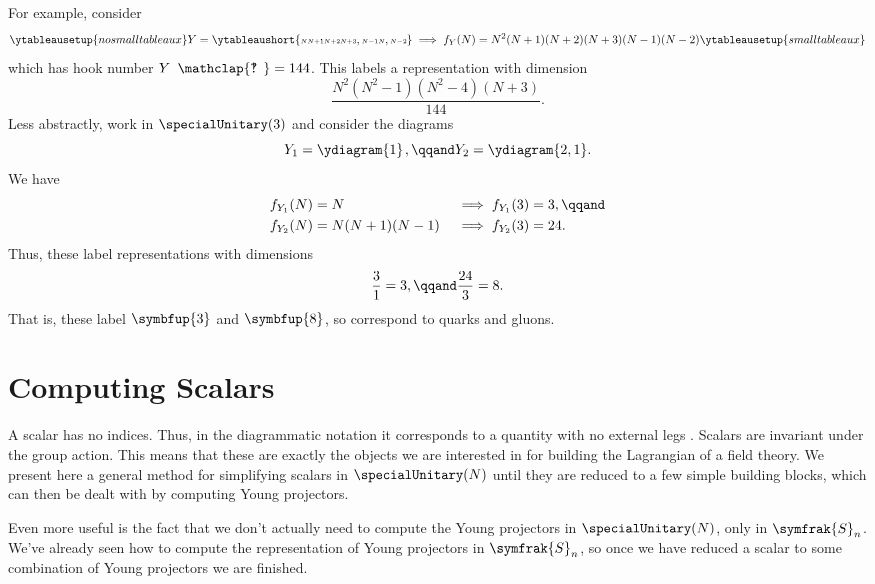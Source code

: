 \documentclass[fleqn]{NotesClass}
\newcommand{\symmetricGroup}[1][n]{\symfrak{S}_{#1}}
\newcommand{\hooknumber}[1]{#1{\phantom{?}\mkern1mu\mathclap{\ooalign{\hfil ? \hfil \cr \hfil ! \hfil}}}}
\newcommand{\rep}[1]{\symbfup{#1}}
\begin{document}
    For example, consider
    \begin{equation}
        \ytableausetup{nosmalltableaux}
        Y = \ytableaushort{{\scriptscriptstyle N}{\scriptscriptstyle N+1}{\scriptscriptstyle N+2}{\scriptscriptstyle N+3},{\scriptscriptstyle N-1}{\scriptscriptstyle N},{\scriptscriptstyle N-2}} \implies f_Y(N) = N^2(N + 1)(N + 2)(N + 3)(N - 1)(N - 2)
        \ytableausetup{smalltableaux}
    \end{equation}
    which has hook number \(\hooknumber{Y} = 144\).
    This labels a representation with dimension
    \begin{equation}
        \frac{N^2(N^2 - 1)(N^2 - 4)(N + 3)}{144}.
    \end{equation}
    Less abstractly, work in \(\specialUnitary(3)\) and consider the diagrams
    \begin{equation}
        Y_1 = \ydiagram{1}\mkern2mu, \qqand Y_2 = \ydiagram{2,1}.
    \end{equation}
    We have
    \begin{align}
        f_{Y_1}(N) &= N &&\implies f_{Y_1}(3) = 3, \qqand\\
        f_{Y_2}(N) &= N(N + 1)(N - 1) &&\implies f_{Y_2}(3) = 24.
    \end{align}
    Thus, these label representations with dimensions
    \begin{equation}
        \frac{3}{1} = 3, \qqand \frac{24}{3} = 8.
    \end{equation}
    That is, these label \(\rep{3}\) and \(\rep{8}\), so correspond to quarks and gluons.
    
    \section{Computing Scalars}
    A scalar has no indices.
    Thus, in the diagrammatic notation it corresponds to a quantity with no external legs \cite[45]{cvitanovic}.
    Scalars are invariant under the group action.
    This means that these are exactly the objects we are interested in for building the Lagrangian of a field theory.
    We present here a general method for simplifying scalars in \(\specialUnitary(N)\) until they are reduced to a few simple building blocks, which can then be dealt with by computing Young projectors.
    
    Even more useful is the fact that we don't actually need to compute the Young projectors in \(\specialUnitary(N)\), only in \(\symmetricGroup\).
    We've already seen how to compute the representation of Young projectors in \(\symmetricGroup\), so once we have reduced a scalar to some combination of Young projectors we are finished.
    
\end{document}

